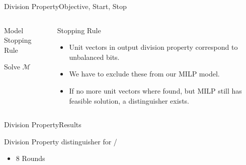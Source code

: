 \begin{frame}{Division Property}{Objective, Start, Stop}
    \begin{columns}
        \begin{column}{0.575\textwidth}
            \begin{block}{Model Stopping Rule}
                \begin{algorithmic}[1]
                    \Statex{}
                        \State{}Solve $\mathcal{M}$
                    \EndWhile{}
                    \EndFunction{}
                \end{algorithmic}
            \end{block}
        \end{column}
        \begin{column}{0.4\textwidth}
            \begin{block}{Stopping Rule}
                \begin{itemize}
                    \item<2-> Unit vectors in output division property correspond to unbalanced bits.
                    \item<2-> We have to exclude these from our MILP model.
                    \item<3-> If no more unit vectors where found, but MILP still has feasible solution, a distinguisher exists.
                \end{itemize}
            \end{block}
        \end{column}
    \end{columns}
\end{frame}


\begin{frame}{Division Property}{Results}
    \begin{block}{Division Property distinguisher for \clyde/}
        \begin{itemize}
            \item 8 Rounds
        \end{itemize}
    \end{block}
\end{frame}
